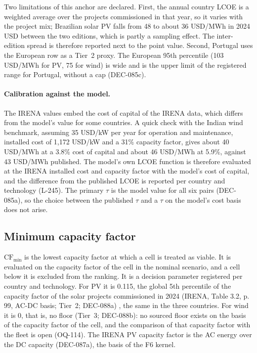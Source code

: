 Two limitations of this anchor are declared. First, the annual country LCOE is a weighted average over the projects commissioned in that year, so it varies with the project mix; Brazilian solar PV falls from 48 to about 36 USD/MWh in 2024 USD between the two editions, which is partly a sampling effect. The inter-edition spread is therefore reported next to the point value. Second, Portugal uses the European row as a Tier~2 proxy. The European 95th percentile (103 USD/MWh for PV, 75 for wind) is wide and is the upper limit of the registered range for Portugal, without a cap (DEC-085c).

\paragraph{Calibration against the model.} The IRENA values embed the cost of capital of the IRENA data, which differs from the model's value for some countries. A quick check with the Indian wind benchmark, assuming 35 USD/kW per year for operation and maintenance, installed cost of 1,172 USD/kW and a 31\% capacity factor, gives about 40 USD/MWh at a 3.8\% cost of capital and about 46 USD/MWh at 5.9\%, against 43 USD/MWh published. %
The model's own LCOE function is therefore evaluated at the IRENA installed cost and capacity factor with the model's cost of capital, and the difference from the published LCOE is reported per country and technology (L-245). The primary $\tau$ is the model value for all six pairs (DEC-085a), so the choice between the published $\tau$ and a $\tau$ on the model's cost basis does not arise.

\subsection{Minimum capacity factor}
\label{sec:g4-cf}
$\mathrm{CF}_{\min}$ is the lowest capacity factor at which a cell is treated as viable. It is evaluated on the capacity factor of the cell in the nominal scenario, and a cell below it is excluded from the ranking. It is a decision parameter registered per country and technology. For PV it is 0.115, the global 5th percentile of the capacity factor of the solar projects commissioned in 2024 (IRENA, Table 3.2, p. 99, AC-DC basis; Tier~2; DEC-088a) \citep{irena2025costs24}, the same in the three countries. For wind it is 0, that is, no floor (Tier~3; DEC-088b): no sourced floor exists on the basis of the capacity factor of the cell, and the comparison of that capacity factor with the fleet is open (OQ-114). The IRENA PV capacity factor is the AC energy over the DC capacity (DEC-087a), the basis of the F6 kernel.

